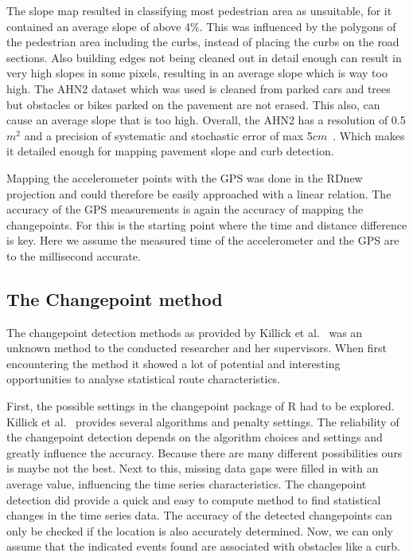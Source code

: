 The slope map resulted in classifying most pedestrian area as unsuitable, for it contained an average slope of above 4\%. This was influenced by the polygons of the pedestrian area including the curbs, instead of placing the curbs on the road sections. Also building edges not being cleaned out in detail enough can result in very high slopes in some pixels, resulting in an average slope which is way too high. The AHN2 dataset which was used is cleaned from parked cars and trees but obstacles or bikes parked on the pavement are not erased. This also, can cause an average slope that is too high. Overall, the AHN2 has a resolution of 0.5$m^2$ and a precision of systematic and stochastic error of max 5$cm$~\cite{VanDerZon2013}. Which makes it detailed enough for mapping pavement slope and curb detection.

Mapping the accelerometer points with the GPS was done in the RDnew projection and could therefore be easily approached with a linear relation. The accuracy of the GPS measurements is again the accuracy of mapping the changepoints. For this is the starting point where the time and distance difference is key. Here we assume the measured time of the accelerometer and the GPS are to the millisecond accurate. 

\subsection{The Changepoint method}
The changepoint detection methods as provided by Killick et al.~\cite{changepoint2015} was an unknown method to the conducted researcher and her supervisors. When first encountering the method it showed a lot of potential and interesting opportunities to analyse statistical route characteristics. 

First, the possible settings in the changepoint package of R had to be explored. Killick et al.~\cite{changepoint2015} provides several algorithms and penalty settings. The reliability of the changepoint detection depends on the algorithm choices and settings and greatly influence the accuracy. Because there are many different possibilities ours is maybe not the best. Next to this, missing data gaps were filled in with an average value, influencing the time series characteristics. The changepoint detection did provide a quick and easy to compute method to find statistical changes in the time series data. The accuracy of the detected changepoints can only be checked if the location is also accurately determined. Now, we can only assume that the indicated events found are associated with obstacles like a curb. 

